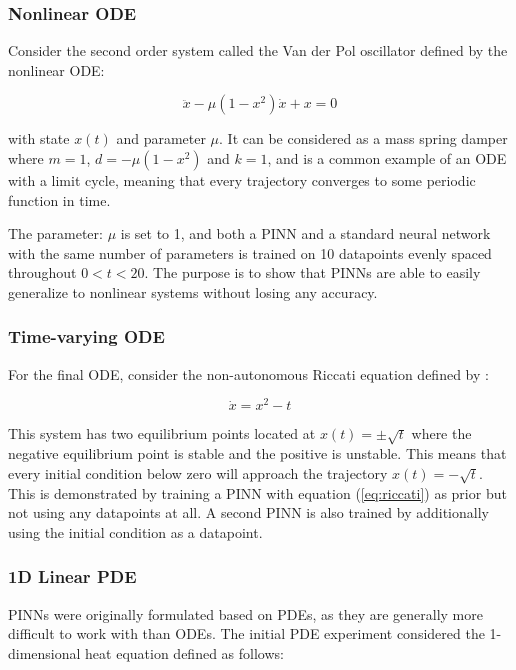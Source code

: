 \subsubsection{Nonlinear ODE}

Consider the second order system called the Van der Pol oscillator defined by the nonlinear ODE:

\begin{equation}
    \ddot{x} - \mu (1 - x^2) \dot{x} + x = 0
    \label{eq:vdp}
\end{equation}

\noindent with state $x(t)$ and parameter $\mu$. It can be considered as a mass spring damper where $m = 1$, $d = - \mu (1 - x^2)$ and $k = 1$, and is a common example of an ODE with a limit cycle, meaning that every trajectory converges to some periodic function in time.

The parameter: $\mu$ is set to 1, and both a PINN and a standard neural network with the same number of parameters is trained on 10 datapoints evenly spaced throughout $0 < t < 20$. The purpose is to show that PINNs are able to easily generalize to nonlinear systems without losing any accuracy.

\subsubsection{Time-varying ODE}

For the final ODE, consider the non-autonomous Riccati equation defined by \cite{odebook}:

\begin{equation}
    \dot{x} = x^2 - t
    \label{eq:riccati}
\end{equation}

This system has two equilibrium points located at $x(t) = \pm \sqrt{t}$ where the negative equilibrium point is stable and the positive is unstable. This means that every initial condition below zero will approach the trajectory $x(t) = - \sqrt{t}$. This is demonstrated by training a PINN with equation (\ref{eq:riccati}) as prior but not using any datapoints at all. A second PINN is also trained by additionally using the initial condition as a datapoint.

\subsubsection{1D Linear PDE}

PINNs were originally formulated based on PDEs, as they are generally more difficult to work with than ODEs. The initial PDE experiment considered the 1-dimensional heat equation defined as follows:

